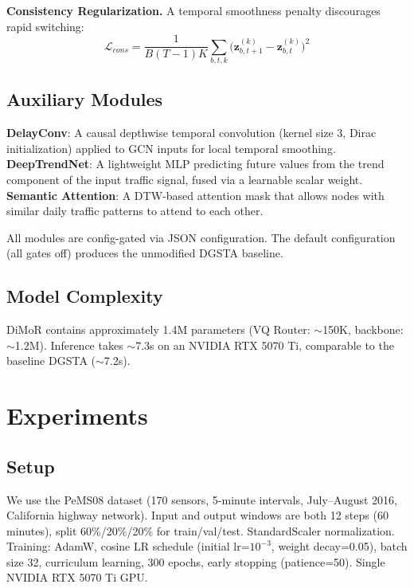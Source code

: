 \documentclass[journal]{IEEEtran}
\begin{document}
\noindent\textbf{Consistency Regularization.} A temporal smoothness penalty discourages rapid switching:
\begin{equation}
\mathcal{L}_{cons} = \frac{1}{B(T-1)K} \sum_{b,t,k} \big(\mathbf{z}_{b,t+1}^{(k)} - \mathbf{z}_{b,t}^{(k)}\big)^2
\label{eq:cons}
\end{equation}

\subsection{Auxiliary Modules}

\textbf{DelayConv}: A causal depthwise temporal convolution (kernel size 3, Dirac initialization) applied to GCN inputs for local temporal smoothing. \textbf{DeepTrendNet}: A lightweight MLP predicting future values from the trend component of the input traffic signal, fused via a learnable scalar weight. \textbf{Semantic Attention}: A DTW-based attention mask that allows nodes with similar daily traffic patterns to attend to each other.

All modules are config-gated via JSON configuration. The default configuration (all gates off) produces the unmodified DGSTA baseline.

\subsection{Model Complexity}

DiMoR contains approximately 1.4M parameters (VQ Router: $\sim$150K, backbone: $\sim$1.2M). Inference takes $\sim$7.3s on an NVIDIA RTX 5070 Ti, comparable to the baseline DGSTA ($\sim$7.2s).

\section{Experiments}

\subsection{Setup}

We use the PeMS08 dataset (170 sensors, 5-minute intervals, July--August 2016, California highway network). Input and output windows are both 12 steps (60 minutes), split 60\%/20\%/20\% for train/val/test. StandardScaler normalization. Training: AdamW, cosine LR schedule (initial lr=$10^{-3}$, weight decay=0.05), batch size 32, curriculum learning, 300 epochs, early stopping (patience=50). Single NVIDIA RTX 5070 Ti GPU.
\end{document}
